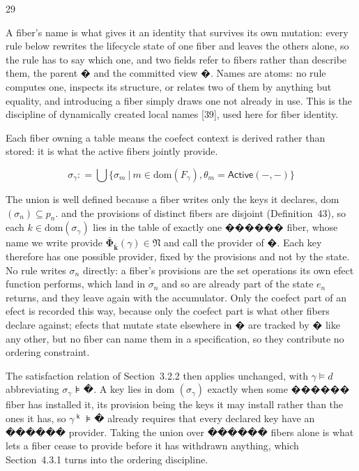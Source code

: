 \documentclass[
  10
]{article}
\begin{document}
29

A fiber's name is what gives it an identity that survives its own
mutation: every rule below rewrites the lifecycle state of one fiber and
leaves the others alone, so the rule has to say which one, and two
fields refer to fibers rather than describe them, the parent � and the
committed view �. Names are atoms: no rule computes one, inspects its
structure, or relates two of them by anything but equality, and
introducing a fiber simply draws one not already in use. This is the
discipline of dynamically created local names {[}39{]}, used here for
fiber identity.

Each fiber owning a table means the coefect context is derived rather
than stored: it is what the active fibers jointly provide.

\[
\sigma _ { \gamma } : = \bigcup \{ \sigma _ { m } ~ | ~ m \in \mathrm { d o m } ( F _ { \gamma } ) , \theta _ { m } = \mathsf { A c t i v e } ( - , - ) \}\tag{40}
\]

The union is well defined because a fiber writes only the keys it
declares, dom \(( \sigma _ { n } ) \subseteq p _ { n } .\) and the
provisions of distinct fibers are disjoint (Definition~43), so each
\(k \in \mathrm { d o m } ( \sigma _ { \gamma } )\) lies in the table of
exactly one ������ fiber, whose name we write provide
\(\mathbf { \bar { \Phi } } _ { \mathbf { \bar { k } } } ( \gamma ) \in \mathfrak { N }\)
and call the provider of �. Each key therefore has one possible
provider, fixed by the provisions and not by the state. No rule writes
\(\sigma _ { n }\) directly: a fiber's provisions are the set operations
its own efect function performs, which land in \(\sigma _ { n }\) and so
are already part of the state \(e _ { n }\) returns, and they leave
again with the accumulator. Only the coefect part of an efect is
recorded this way, because only the coefect part is what other fibers
declare against; efects that mutate state elsewhere in � are tracked by
� like any other, but no fiber can name them in a specification, so they
contribute no ordering constraint.

The satisfaction relation of Section~3.2.2 then applies unchanged, with
\(\gamma \models d\) abbreviating \(\sigma _ { \gamma }\) ⊧ �. A key
lies in dom \(\left( \sigma _ { \gamma } \right)\) exactly when some
������ fiber has installed it, its provision being the keys it may
install rather than the ones it has, so \(\gamma ^ { \textsf { k } }\) ⊧
� already requires that every declared key have an ������ provider.
Taking the union over ������ fibers alone is what lets a fiber cease to
provide before it has withdrawn anything, which Section~4.3.1 turns into
the ordering discipline.
\end{document}

